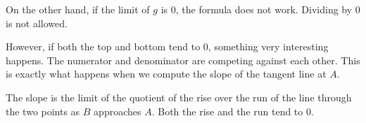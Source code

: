 \documentclass[pdftex, brazil, 12pt, twoside]{article}
\begin{document}
On the other hand, if the limit of $g$ is $0$,
the formula does not work.
Dividing by $0$ is not allowed.

\begin{figure}[H]
  \begin{center}
  \end{center}
\end{figure}

However, if both the top and bottom tend to $0$,
something very interesting happens.
The numerator and denominator are
competing against each other.
This is exactly what happens when
we compute the slope of the tangent line at $A$.

\begin{figure}[H]
  \begin{center}
  \end{center}
\end{figure}

The slope is the limit of the quotient of the rise
over the run of the line through the two points
as $B$ approaches $A$. Both the rise and the run tend to $0$.
\end{document}

